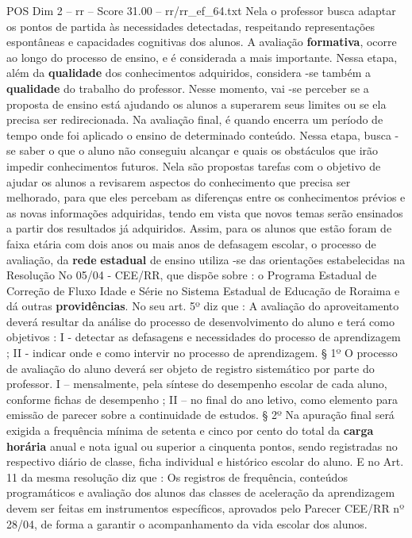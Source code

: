 \begin{textsample}{POS Dim 2 – rr – Score 31.00 – rr/rr\_ef\_64.txt}
Nela o professor busca adaptar os pontos de partida às necessidades detectadas, respeitando representações espontâneas e capacidades cognitivas dos alunos.
A avaliação \textbf{formativa}, ocorre ao longo do processo de ensino, e é considerada a mais importante.
Nessa etapa, além da \textbf{qualidade} dos conhecimentos adquiridos, considera -se também a \textbf{qualidade} do trabalho do professor.
Nesse momento, vai -se perceber se a proposta de ensino está ajudando os alunos a superarem seus limites ou se ela precisa ser redirecionada.
Na avaliação final, é quando encerra um período de tempo onde foi aplicado o ensino de determinado conteúdo.
Nessa etapa, busca -se saber o que o aluno não conseguiu alcançar e quais os obstáculos que irão impedir conhecimentos futuros.
Nela são propostas tarefas com o objetivo de ajudar os alunos a revisarem aspectos do conhecimento que precisa ser melhorado, para que eles percebam as diferenças entre os conhecimentos prévios e as novas informações adquiridas, tendo em vista que novos temas serão ensinados a partir dos resultados já adquiridos.
Assim, para os alunos que estão foram de faixa etária com dois anos ou mais anos de defasagem escolar, o processo de avaliação, da \textbf{rede} \textbf{estadual} de ensino utiliza -se das orientações estabelecidas na Resolução No 05/04 - CEE/RR, que dispõe sobre : o Programa Estadual de Correção de Fluxo Idade e Série no Sistema Estadual de Educação de Roraima e dá outras \textbf{providências}.
No seu art. 5º diz que : A avaliação do aproveitamento deverá resultar da análise do processo de desenvolvimento do aluno e terá como objetivos : I - detectar as defasagens e necessidades do processo de aprendizagem ; II - indicar onde e como intervir no processo de aprendizagem. § 1º O processo de avaliação do aluno deverá ser objeto de registro sistemático por parte do professor.
I – mensalmente, pela síntese do desempenho escolar de cada aluno, conforme fichas de desempenho ; II – no final do ano letivo, como elemento para emissão de parecer sobre a continuidade de estudos. § 2º Na apuração final será exigida a frequência mínima de setenta e cinco por cento do total da \textbf{carga} \textbf{horária} anual e nota igual ou superior a cinquenta pontos, sendo registradas no respectivo diário de classe, ficha individual e histórico escolar do aluno.
E no Art. 11 da mesma resolução diz que : Os registros de frequência, conteúdos programáticos e avaliação dos alunos das classes de aceleração da aprendizagem devem ser feitas em instrumentos específicos, aprovados pelo Parecer CEE/RR nº 28/04, de forma a garantir o acompanhamento da vida escolar dos alunos.

\end{textsample}
